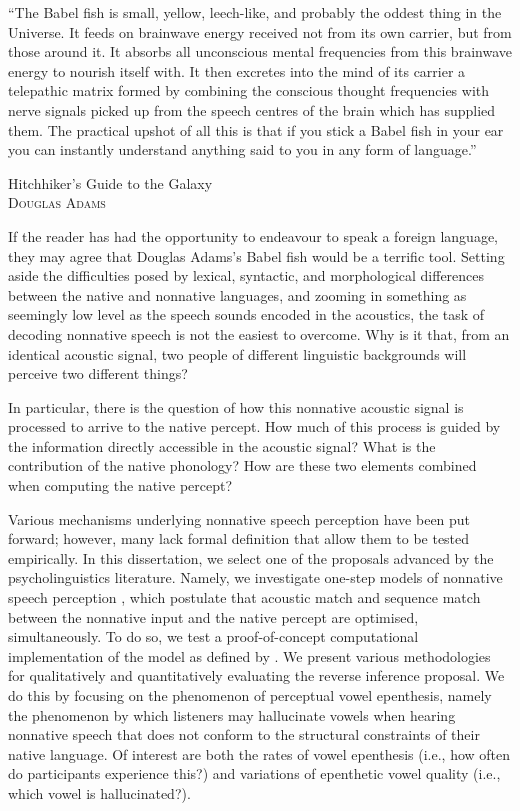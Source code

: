 %


\setlength{\epigraphwidth}{0.7\textwidth}
\epigraph{``The Babel fish is small, yellow, leech-like, and probably the oddest thing in the Universe. It feeds on brainwave energy received not from its own carrier, but from those around it. It absorbs all unconscious mental frequencies from this brainwave energy to nourish itself with. It then excretes into the mind of its carrier a telepathic matrix formed by combining the conscious thought frequencies with nerve signals picked up from the speech centres of the brain which has supplied them. The practical upshot of all this is that if you stick a Babel fish in your ear you can instantly understand anything said to you in any form of language.''}{Hitchhiker's Guide to the Galaxy \\ \textsc{Douglas Adams}}

If the reader has had the opportunity to endeavour to speak a foreign language, they may agree that Douglas Adams's Babel fish would be a terrific tool. Setting aside the difficulties posed by lexical, syntactic, and morphological differences between the native and nonnative languages, and zooming in something as seemingly low level as the speech sounds encoded in the acoustics, the task of decoding nonnative speech is not the easiest to overcome. Why is it that, from an identical acoustic signal, two people of different linguistic backgrounds will perceive two different things?  

In particular, there is the question of how this nonnative acoustic signal is processed to arrive to the native percept. How much of this process is guided by the information directly accessible in the acoustic signal? What is the contribution of the native phonology? How are these two elements combined when computing the native percept?

Various mechanisms underlying nonnative speech perception have been put forward; however, many lack formal definition that allow them to be tested empirically.  
In this dissertation, we select one of the proposals advanced by the psycholinguistics literature. Namely, we investigate one-step models of nonnative speech perception \cite{dupoux2011, dejong2012, wilson2013, durvasula2015}, which postulate that acoustic match and sequence match between the nonnative input and the native percept are optimised, simultaneously. To do so, we test a proof-of-concept computational implementation of the model as defined by \cite{wilson2013}. 
We present various methodologies for qualitatively and quantitatively evaluating the reverse inference proposal. We do this by focusing on the phenomenon of perceptual vowel epenthesis, namely the phenomenon by which listeners may hallucinate vowels when hearing nonnative speech that does not conform to the structural constraints of their native language. Of interest are both the rates of vowel epenthesis (i.e., how often do participants experience this?) and variations of epenthetic vowel quality (i.e., which vowel is hallucinated?).

